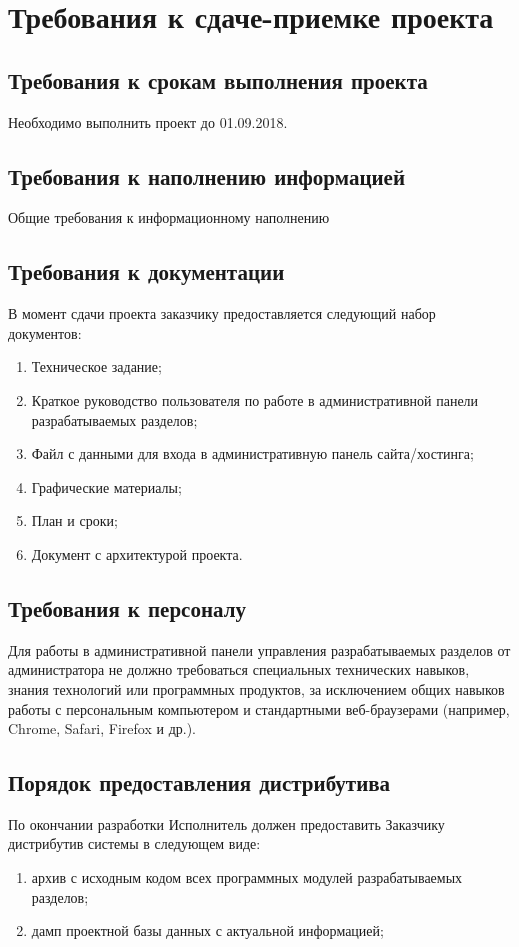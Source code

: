 \section{Требования к сдаче-приемке проекта}
\subsection{Требования к срокам выполнения проекта}
Необходимо выполнить проект до 01.09.2018.

\subsection{Требования к наполнению информацией}
Общие требования к информационному наполнению

\subsection{Требования к документации}
В момент сдачи проекта заказчику предоставляется следующий набор документов:
\begin{enumerate}
	\item Техническое задание;
	\item Краткое руководство пользователя по работе в административной панели разрабатываемых разделов;
	\item Файл с данными для входа в административную панель сайта/хостинга;
	\item Графические материалы;
	\item План и сроки;
	\item Документ с архитектурой проекта.
\end{enumerate}

\subsection{Требования к персоналу}
Для работы в административной панели управления разрабатываемых разделов от администратора не должно требоваться специальных технических навыков, знания технологий или программных продуктов, за исключением общих навыков работы с персональным компьютером и стандартными веб-браузерами (например, Chrome, Safari, Firefox и др.).

\subsection{Порядок предоставления дистрибутива}
По окончании разработки Исполнитель должен предоставить Заказчику дистрибутив системы в следующем виде:
\begin{enumerate}
	\item архив с исходным кодом всех программных модулей разрабатываемых разделов;
	\item дамп проектной базы данных с актуальной информацией;
\end{enumerate}

